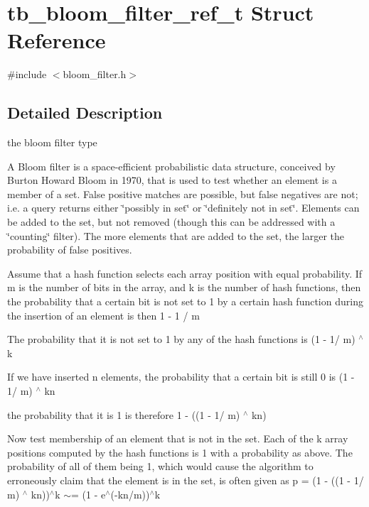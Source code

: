 \hypertarget{structtb__bloom__filter__ref__t}{\section{tb\-\_\-bloom\-\_\-filter\-\_\-ref\-\_\-t Struct Reference}
\label{structtb__bloom__filter__ref__t}
}


{\ttfamily \#include $<$bloom\-\_\-filter.\-h$>$}



\subsection{Detailed Description}
the bloom filter type

A Bloom filter is a space-\/efficient probabilistic data structure, conceived by Burton Howard Bloom in 1970, that is used to test whether an element is a member of a set. False positive matches are possible, but false negatives are not; i.\-e. a query returns either \char`\"{}possibly in set\char`\"{} or \char`\"{}definitely not in set\char`\"{}. Elements can be added to the set, but not removed (though this can be addressed with a \char`\"{}counting\char`\"{} filter). The more elements that are added to the set, the larger the probability of false positives.

Assume that a hash function selects each array position with equal probability. If m is the number of bits in the array, and k is the number of hash functions, then the probability that a certain bit is not set to 1 by a certain hash function during the insertion of an element is then 1 -\/ 1 / m

The probability that it is not set to 1 by any of the hash functions is (1 -\/ 1/ m) $^\wedge$ k

If we have inserted n elements, the probability that a certain bit is still 0 is (1 -\/ 1/ m) $^\wedge$ kn

the probability that it is 1 is therefore 1 -\/ ((1 -\/ 1/ m) $^\wedge$ kn)

Now test membership of an element that is not in the set. Each of the k array positions computed by the hash functions is 1 with a probability as above. The probability of all of them being 1, which would cause the algorithm to erroneously claim that the element is in the set, is often given as p = (1 -\/ ((1 -\/ 1/ m) $^\wedge$ kn))$^\wedge$k $\sim$= (1 -\/ e$^\wedge$(-\/kn/m))$^\wedge$k

